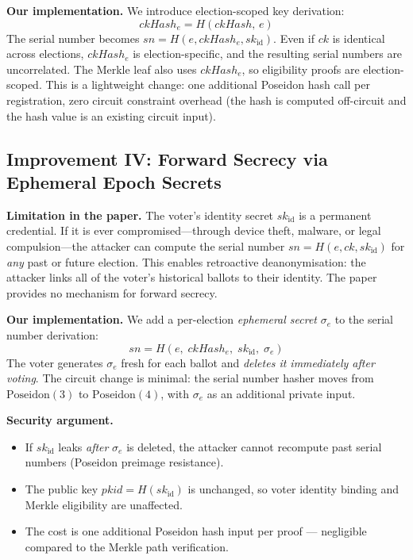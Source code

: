 \documentclass[conference]{IEEEtran}
\begin{document}
\textbf{Our implementation.}
We introduce election-scoped key derivation:
\[
  \mathit{ckHash}_e = H(\mathit{ckHash},\, e)
\]
The serial number becomes $\mathit{sn} = H(e, \mathit{ckHash}_e, \mathit{sk}_{\mathrm{id}})$.
Even if $\mathit{ck}$ is identical across elections, $\mathit{ckHash}_e$ is
election-specific, and the resulting serial numbers are uncorrelated.  The
Merkle leaf also uses $\mathit{ckHash}_e$, so eligibility proofs are
election-scoped.  This is a lightweight change: one additional Poseidon hash
call per registration, zero circuit constraint overhead (the hash is computed
off-circuit and the hash value is an existing circuit input).

\subsection{Improvement IV: Forward Secrecy via Ephemeral Epoch Secrets}

\textbf{Limitation in the paper.}
The voter's identity secret $\mathit{sk}_{\mathrm{id}}$ is a permanent
credential.  If it is ever compromised---through device theft, malware, or
legal compulsion---the attacker can compute the serial number
$\mathit{sn} = H(e, \mathit{ck}, \mathit{sk}_{\mathrm{id}})$ for \emph{any}
past or future election.  This enables retroactive deanonymisation: the
attacker links all of the voter's historical ballots to their identity.
The paper provides no mechanism for forward secrecy.

\textbf{Our implementation.}
We add a per-election \emph{ephemeral secret} $\sigma_e$ to the serial number
derivation:
\[
  \mathit{sn} = H(e,\; \mathit{ckHash}_e,\; \mathit{sk}_{\mathrm{id}},\; \sigma_e)
\]
The voter generates $\sigma_e$ fresh for each ballot and \emph{deletes it
immediately after voting}.  The circuit change is minimal: the serial number
hasher moves from $\mathrm{Poseidon}(3)$ to $\mathrm{Poseidon}(4)$, with
$\sigma_e$ as an additional private input.

\vspace{4pt}
\noindent\textbf{Security argument.}
\begin{itemize}
  \item If $\mathit{sk}_{\mathrm{id}}$ leaks \emph{after} $\sigma_e$ is
    deleted, the attacker cannot recompute past serial numbers (Poseidon
    preimage resistance).
  \item The public key $\mathit{pkid} = H(\mathit{sk}_{\mathrm{id}})$ is
    unchanged, so voter identity binding and Merkle eligibility are unaffected.
  \item The cost is one additional Poseidon hash input per proof --- negligible
    compared to the Merkle path verification.
\end{itemize}
\end{document}

